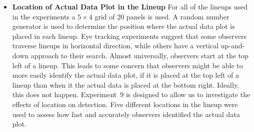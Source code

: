 \documentclass[10pt]{article}\usepackage[]{graphicx}\usepackage[]{color}
\begin{document}
\begin{itemize}


\item{\bf Location of Actual Data Plot in the Lineup} For all of the lineups used in the experiments a $5\times 4$ grid of 20 panels is used. A random number generator is used to determine the position where the actual data plot is placed in each lineup. Eye tracking experiments \citep{zhao:2012} suggest that some observers traverse lineups in horizontal direction, while others have a vertical up-and-down approach to their search. Almost universally, observers start at the top left of a lineup. This leads to some concern that observers might be able to more easily identify the actual data plot, if it is placed at the top left of a lineup than when it the actual data is placed at the bottom right.
Ideally, this does not happen. Experiment~9  is designed to allow us to investigate the effects of location on detection. Five different locations in the lineup were used to assess how fast and accurately observers identified the actual data plot.


\end{itemize}
\end{document}
